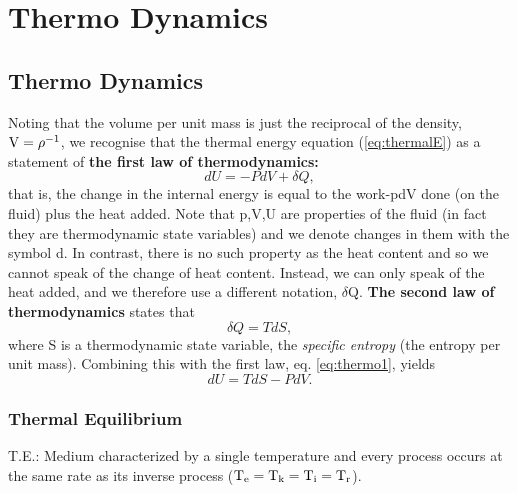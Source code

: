 \chapter{Thermo Dynamics}
\section{Thermo Dynamics}

Noting that the volume per unit mass is just the reciprocal of the density, \ie $\rm V = \rho^{-1}$, 
we recognise that the thermal energy equation (\ref{eq:thermalE}) as a statement of {\bf the first law of
thermodynamics:}
\begin{equation}\label{eq:thermo1}
  dU = -P dV + \delta Q,
\end{equation}
that is, the change in the internal energy is equal to the work-pdV done (on the fluid) plus the heat 
added. Note that p,V,U are properties of the fluid (in fact they are thermodynamic state variables) and we 
denote changes in them with the symbol d. In contrast, there is no such property as the heat content and 
so we cannot speak of the change of heat content. Instead, we can only speak of the heat added, and we
therefore use a different notation, \ie $\delta$Q. {\bf The second law of thermodynamics} states that
\begin{equation}\label{eq:eq:thermo2}
  \delta Q = T dS,
\end{equation}
where S is a thermodynamic state variable, the {\it specific entropy} (\ie the entropy per unit mass).
Combining this with the first law, eq. \ref{eq:thermo1}, yields
\begin{equation}\label{eq:thermo}
  dU = TdS - PdV.
\end{equation}

\bigskip
\subsection{Thermal Equilibrium}\label{sec:thermaleq}
T.E.: Medium characterized by a single temperature and every process occurs at the same rate
as its inverse process ($\rm T_{e} = T_{k} = T_{i} = T_{r}$).

